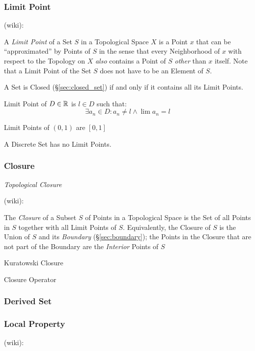 \subsubsection{Limit Point}\label{sec:limit_point}

(wiki):

A \emph{Limit Point} of a Set $S$ in a Topological Space $X$ is a Point $x$
that can be ``approximated'' by Points of $S$ in the sense that every
Neighborhood of $x$ with respect to the Topology on $X$ \emph{also} contains a
Point of $S$ \emph{other} than $x$ itself. Note that a Limit Point of the Set
$S$ does not have to be an Element of $S$.

A Set is Closed (\S\ref{sec:closed_set}) if and only if it contains all its
Limit Points.

Limit Point of $D \in \mathbb{R}$ is $l \in D$ such that:
\[
  \exists a_n \in D : a_n \neq l \wedge \lim a_n = l
\]

Limit Points of $(0,1)$ are $[0,1]$

A Discrete Set has no Limit Points. %



\subsubsection{Closure}\label{sec:topological_closure}

\emph{Topological Closure}

(wiki):

The \emph{Closure} of a Subset $S$ of Points in a Topological Space is the Set
of all Points in $S$ together with all Limit Points of $S$. Equivalently, the
Closure of $S$ is the Union of $S$ and its \emph{Boundary}
(\S\ref{sec:boundary}); the Points in the Closure that are not part of the
Boundary are the \emph{Interior} Points of $S$

Kuratowski Closure

Closure Operator



\subsubsection{Derived Set}\label{sec:derived_set}

\subsubsection{Local Property}\label{sec:local_property}

(wiki):

